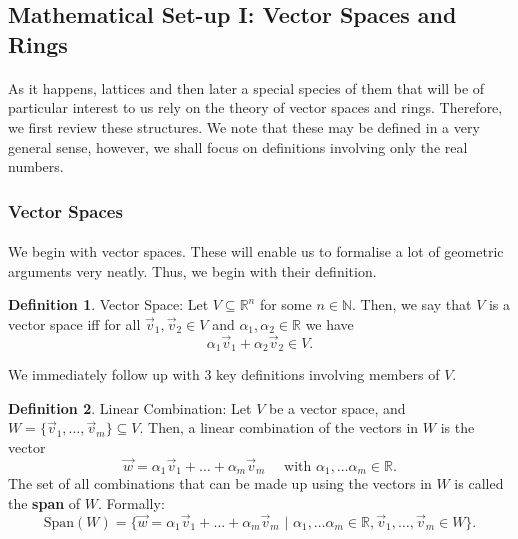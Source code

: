 \documentclass{article}
\theoremstyle{definition}
\newtheorem{definition}{Definition}[section]
\newcommand{\Nat}{\mathbb{N}}
\newcommand{\Reals}{\mathbb{R}}
\newcommand{\Span}{\text{Span}}
\begin{document}
\subsection{Mathematical Set-up I: Vector Spaces and Rings}
\paragraph{} As it happens, lattices and then later a special species of them
that will be of particular interest to us rely on the theory of vector
spaces and rings. Therefore, we first review these structures. We note that
these may be defined in a very general sense, however, we shall focus on
definitions involving only the real numbers.
\subsubsection{Vector Spaces}
\paragraph{} We begin with vector spaces. These will enable us to formalise a
lot of geometric arguments very neatly. Thus, we begin with their definition.
\begin{definition}{Vector Space:}
  Let $V \subseteq \Reals^n$ for some $n \in \Nat$. Then, we say that $V$ is a
  vector space iff for all $\vec{v}_1, \vec{v}_2 \in V$ and $\alpha_1, \alpha_2
  \in \Reals$ we have
  \[
    \alpha_1\vec{v}_1 + \alpha_2\vec{v}_2 \in V.
  \]
\end{definition}
We immediately follow up with 3 key definitions involving members of $V$.
\begin{definition}{Linear Combination:}
  Let $V$ be a vector space, and $W = \{\vec{v}_1, \hdots, \vec{v}_m\} \subseteq
  V$. Then, a linear combination of the vectors in $W$ is the vector
  \[
    \vec{w} = \alpha_1\vec{v}_1 + \hdots + \alpha_m\vec{v}_m\quad\text{ with }
    \alpha_1, \hdots \alpha_m \in \Reals.
  \]
  The set of all combinations that can be made up using the vectors in $W$ is
  called the \textbf{span} of $W$. Formally:
  \[
    \Span(W) = \{\vec{w} = \alpha_1\vec{v}_1 + \hdots + \alpha_m\vec{v}_m
    \,\,|\,\, \alpha_1, \hdots \alpha_m \in \Reals, \vec{v}_1,\hdots, \vec{v}_m
    \in W \}.
  \]
\end{definition}
\end{document}
